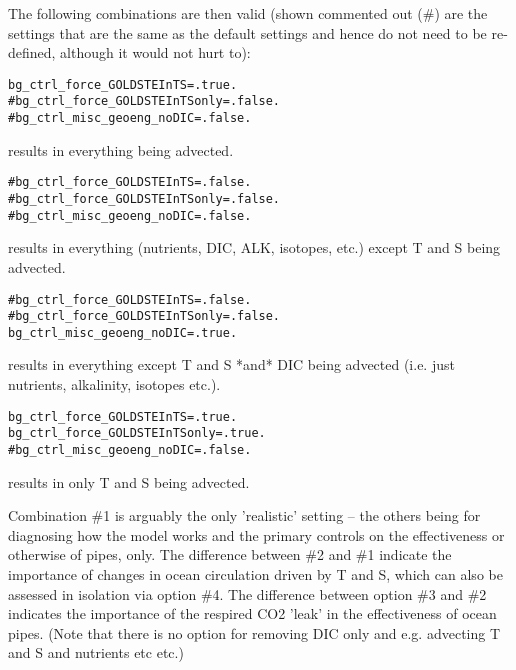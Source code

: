 \documentclass[10pt,twoside]{article}
\begin{document}
\begin{compactitem}
\begin{compactitem}
\end{compactitem}

The following combinations are then valid (shown commented out (\#) are the settings that are the same as the default settings and hence do not need to be re-defined, although it would not hurt to):

          \begin{compactenum}
        \item 
        \begin{verbatim}
bg_ctrl_force_GOLDSTEInTS=.true.
#bg_ctrl_force_GOLDSTEInTSonly=.false.
#bg_ctrl_misc_geoeng_noDIC=.false.
        \end{verbatim}
        results in everything being advected.
        \item 
        \begin{verbatim}
#bg_ctrl_force_GOLDSTEInTS=.false.
#bg_ctrl_force_GOLDSTEInTSonly=.false.
#bg_ctrl_misc_geoeng_noDIC=.false.
        \end{verbatim}
        results in everything (nutrients, DIC, ALK, isotopes, etc.) except T and S being advected.
        \item 
        \begin{verbatim}
#bg_ctrl_force_GOLDSTEInTS=.false.
#bg_ctrl_force_GOLDSTEInTSonly=.false.
bg_ctrl_misc_geoeng_noDIC=.true.
        \end{verbatim}
        results in everything except T and S *and* DIC being advected (i.e. just nutrients, alkalinity, isotopes etc.).
        \item 
        \begin{verbatim}
bg_ctrl_force_GOLDSTEInTS=.true.
bg_ctrl_force_GOLDSTEInTSonly=.true.
#bg_ctrl_misc_geoeng_noDIC=.false.
        \end{verbatim}
        results in only T and S being advected.
        
\end{compactenum}

Combination \#1 is arguably the only 'realistic' setting -- the others being for diagnosing how the model works and the primary controls on the effectiveness or otherwise of pipes, only. The difference between \#2 and \#1 indicate the importance of changes in ocean circulation driven by T and S, which can also be assessed in isolation via option \#4. The difference between option \#3 and \#2 indicates the importance of the respired CO2 'leak' in the effectiveness of ocean pipes. (Note that there is no option for removing DIC only and e.g. advecting T and S and nutrients etc etc.)

\end{compactitem}
\end{document}
